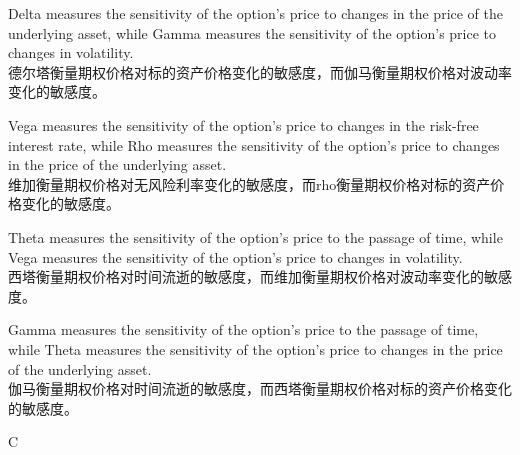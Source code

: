 \documentclass{article}
\begin{document}
\begin{choices}
    \item Delta measures the sensitivity of the option's price to changes in the price of the underlying asset, while Gamma measures the sensitivity of the option's price to changes in volatility.\\
    德尔塔衡量期权价格对标的资产价格变化的敏感度，而伽马衡量期权价格对波动率变化的敏感度。
    \item Vega measures the sensitivity of the option's price to changes in the risk-free interest rate, while Rho measures the sensitivity of the option's price to changes in the price of the underlying asset.\\
    维加衡量期权价格对无风险利率变化的敏感度，而rho衡量期权价格对标的资产价格变化的敏感度。
    \item Theta measures the sensitivity of the option's price to the passage of time, while Vega measures the sensitivity of the option's price to changes in volatility.\\
    西塔衡量期权价格对时间流逝的敏感度，而维加衡量期权价格对波动率变化的敏感度。
    \item Gamma measures the sensitivity of the option's price to the passage of time, while Theta measures the sensitivity of the option's price to changes in the price of the underlying asset.\\
    伽马衡量期权价格对时间流逝的敏感度，而西塔衡量期权价格对标的资产价格变化的敏感度。
\end{choices}

\begin{correctanswer}
    C
\end{correctanswer}
\end{document}

